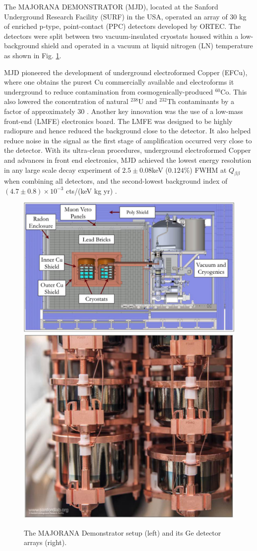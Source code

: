 The MAJORANA DEMONSTRATOR (MJD), located at the Sanford Underground Research Facility (SURF) in the USA, operated an array of 30 kg of enriched p-type, point-contact (PPC) detectors developed by ORTEC. The detectors were split between two vacuum-insulated cryostats housed within a low-background shield and operated in a vacuum at liquid nitrogen (LN) temperature as shown in Fig. \ref{fig:mjd}. 

MJD pioneered the development of underground electroformed Copper (EFCu), where one obtains the purest Cu commercially available and electroforms it underground to reduce contamination from cosmogenically-produced $^{60}$Co. This also lowered the concentration of natural $^{238}$U and $^{232}$Th contaminants by a factor of approximately 30 \cite{Abgrall:2016cct}. Another key innovation was the use of a low-mass front-end (LMFE) electronics board. The LMFE was designed to be highly radiopure and hence reduced the background close to the detector. It also helped reduce noise in the signal as the first stage of amplification occurred very close to the detector. With its ultra-clean procedures, underground electroformed Copper and advances in front end electronics, MJD achieved the lowest energy resolution in any large scale {\onbb} decay experiment of $2.5\pm0.08$keV ($0.124\%$) FWHM at $Q_{\beta\beta}$ when combining all detectors, and the second-lowest background index of $(4.7\pm 0.8) \times 10^{-3}$ cts/(keV kg yr) \cite{Majorana_2019nbd}.

\begin{figure}
  \centering
  \includegraphics[height=0.34\columnwidth]{ch2/figs/mjd_setup.pdf}
  \qquad
  \includegraphics[height=0.34\columnwidth]{ch2/figs/mjd_ppc_array.pdf}
  \caption{The MAJORANA Demonstrator setup (left) and its Ge detector arrays (right).}
    \label{fig:mjd}
  \end{figure}
 
